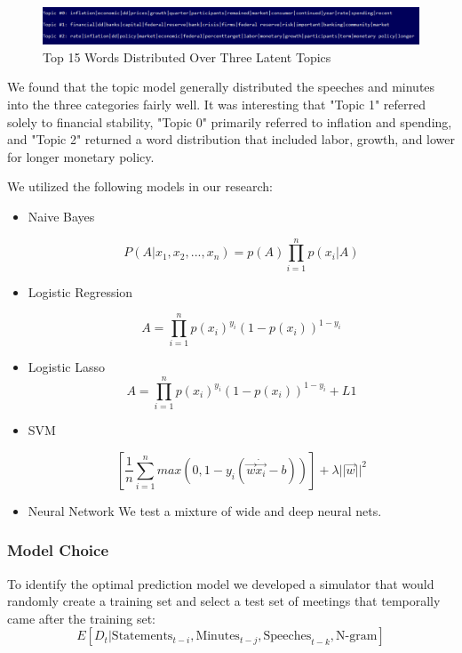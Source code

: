 \documentclass[11pt]{article}
\newcommand{\vertSpace}[1]{\vspace{3mm}}
\begin{document}
\begin{figure}[h!]
  \includegraphics[width=\linewidth]{Topic-Model-3-topics.PNG}
  \caption{Top 15 Words Distributed Over Three Latent Topics}
  \label{fig:LDA}
\end{figure}

We found that the topic model generally distributed the speeches and minutes into the three categories fairly well.  It was interesting that "Topic 1" referred solely to financial stability, "Topic 0" primarily referred to inflation and spending, and "Topic 2" returned a word distribution that included labor, growth, and lower for longer monetary policy. \vertSpace

\subsubsection{Supervised Models}

We utilized the following models in our research: 

  \begin{itemize}

    \item Naive Bayes

      $$P(A|x_1,x_2,...,x_n) = p(A)\prod_{i=1}^n p(x_i|A)$$

    \item Logistic Regression

     $$A = \prod_{i=1}^n p(x_i)^{y_i}(1-p(x_i))^{1-y_i}$$

    \item Logistic Lasso
     $$A = \prod_{i=1}^n p(x_i)^{y_i}(1-p(x_i))^{1-y_i}+ L1$$
    \item SVM

     $$\left [\frac{1}{n} \sum_{i=1}^n max(0,1 - y_i(\vec{w} \dot \vec{x_i} - b)) \right] + \lambda ||\vec{w}||^2$$
    \item Neural Network
      We test a mixture of wide and deep neural nets. 
  \end{itemize}



\subsubsection{Model Choice} 

To identify the optimal prediction model we developed a simulator that would randomly create a training set and select a test set of meetings that temporally came after the training set: $$E[D_t | \mbox{Statements}_{t-i}, \mbox{Minutes}_{t-j} , \mbox{Speeches}_{t-k}, \mbox{N-gram}]$$  
\end{document}
